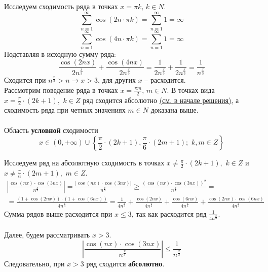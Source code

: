 \documentclass[a5paper, 10pt]{article}
\theoremstyle{definition}
\theoremstyle{plain}
\theoremstyle{remark}
\begin{document}
Исследуем сходимость ряда в точках $x = \pi k, \, k \in N$.
\begin{equation*}
\sum \limits_{n = 1}^{\infty} \cos( 2n\cdot \pi k) = \sum \limits_{n = 1}^{\infty} 1 = \infty
\end{equation*}
\begin{equation*}
\sum \limits_{n = 1}^{\infty} \cos( 4n\cdot \pi k) = \sum \limits_{n = 1}^{\infty} 1 = \infty
\end{equation*}
Подставляя в исходную сумму ряда:
\begin{equation*}
 \frac{\cos( 2nx) }{2n^{\frac{x}{3}}}+\frac{ \cos (4nx) }{2n^{\frac{x}{3}}} = \frac{1 }{2n^{\frac{x}{3}}}+\frac{1 }{2n^{\frac{x}{3}}} = \frac{1 }{n^{\frac{x}{3}}}
\end{equation*}
Сходится при $n^{\frac{x}{3}} > n \to x > 3$, для других $x$ -- расходится.\\

Рассмотрим поведение ряда в точках $x = \frac{\pi m}{2}, \, m \in N$. В точках вида $x = \frac{\pi}{2} \cdot (2k + 1), \,\, k \in  Z$ ряд сходится абсолютно \hyperlink{pdf}{ (см. в начале решения)}, а сходимость ряда при четных значениях $m \in N$ доказана выше.\\\\
Область \textbf{условной} сходимости  $$x \in (0, + \infty)  \cup \left\{  \frac{\pi}{2} \cdot (2k + 1), \frac{\pi}{6} \cdot (2m + 1); \,\, k ,  m\in Z\right\}$$

Исследуем ряд на абсолютную сходимость в точках  $x \neq \frac{\pi}{2} \cdot (2k + 1), \,\, k \in Z$  и $x \neq \frac{\pi}{6} \cdot (2m + 1), \,\, m \in Z$.
\begin{multline*}
\left| \frac{\cos( nx) \cdot \cos (3nx) }{n^{\frac{x}{3}}}  \right| =  \frac{\left|\cos( nx) \cdot \cos (3nx)\right| }{n^{\frac{x}{3}}}
\geq   \frac{\left(\cos( nx) \cdot \cos (3nx)\right)^2 }{n^{\frac{x}{3}}} = \\
= \frac{\left(1 + \cos(2 nx)\right) \cdot \left(1 +  \cos (6nx)\right)}{4n^{\frac{x}{3}}} =
\frac{1}{4n^{\frac{x}{3}}}+\frac{ \cos(2 nx)}{4n^{\frac{x}{3}}}+\frac{\cos (6nx)}{4n^{\frac{x}{3}}}+\frac{\cos(2 nx) \cdot \cos (6nx)}{4n^{\frac{x}{3}}}
\end{multline*}
Сумма рядов выше расходится при $x \leq 3$, так как расходится ряд $\frac{1}{4n^{\frac{x}{3}}}$.\\\\
 Далее, будем рассматривать $x > 3$.
\begin{equation*}
\left| \frac{\cos( nx) \cdot \cos (3nx) }{n^{\frac{x}{3}}}  \right| \leq  \frac{1}{n^{\frac{x}{3}}}
\end{equation*}
Следовательно, при $x > 3$ ряд сходится \textbf{абсолютно}.\\
 
\end{document}

